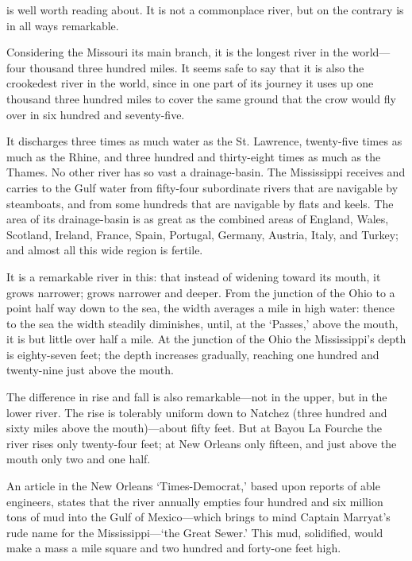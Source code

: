 \documentclass{novelette}
\begin{document}
 is well worth reading about. It is not a
commonplace river, but on the contrary is in all ways remarkable.


Considering the
Missouri its main branch, it is the longest river in the world---four
thousand three hundred miles. It seems safe to say that it is also the
crookedest river in the world, since in one part of its journey it uses
up one thousand three hundred miles to cover the same ground that the
crow would fly over in six hundred and seventy-five.

It discharges three
times as much water as the St. Lawrence, twenty-five times as much
as the Rhine, and three hundred and thirty-eight times as much as the
Thames. No other river has so vast a drainage-basin. The
Mississippi receives and carries to the Gulf water from fifty-four
subordinate rivers that are navigable by steamboats, and from some
hundreds that are navigable by flats and keels. The area of its
drainage-basin is as great as the combined areas of England, Wales,
Scotland, Ireland, France, Spain, Portugal, Germany, Austria, Italy,
and Turkey; and almost all this wide region is fertile.

It is a remarkable river in this: that instead of widening toward its
mouth, it grows narrower; grows narrower and deeper. From the junction
of the Ohio to a point half way down to the sea, the width averages a
mile in high water: thence to the sea the width steadily diminishes,
until, at the `Passes,' above the mouth, it is but little over half
a mile. At the junction of the Ohio the Mississippi's depth is
eighty-seven feet; the depth increases gradually, reaching one hundred
and twenty-nine just above the mouth.

The difference in rise and fall is also remarkable---not in the upper,
but in the lower river. The rise is tolerably uniform down to Natchez
(three hundred and sixty miles above the mouth)---about fifty feet.
But at Bayou La Fourche the river rises only twenty-four feet; at New
Orleans only fifteen, and just above the mouth only two and one half.

An article in the New Orleans `Times-Democrat,' based upon reports of
able engineers, states that the river annually empties four hundred and
six million tons of mud into the Gulf of Mexico---which brings to mind
Captain Marryat's rude name for the Mississippi---`the Great Sewer.' This
mud, solidified, would make a mass a mile square and two hundred and
forty-one feet high.
\end{document}
